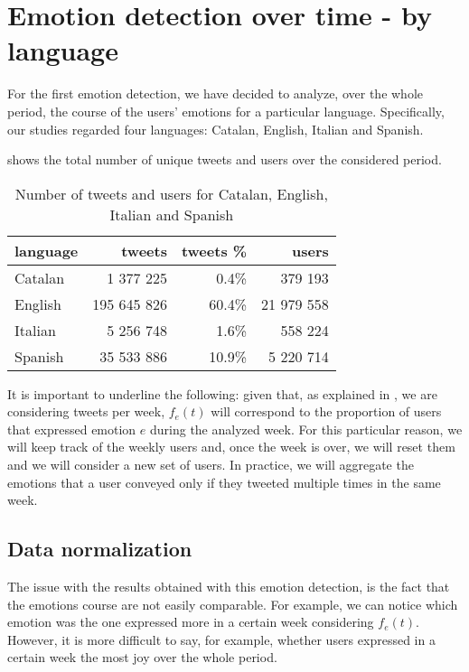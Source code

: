 \section{Emotion detection over time - by language}
\label{sec:emotion-by-language}

For the first emotion detection, we have decided to analyze, over the whole period, the course of the users' emotions for a particular language. Specifically, our studies regarded four languages: Catalan, English, Italian and Spanish.

 shows the total number of unique tweets and users over the considered period.

\begin{table}[h]
	\centering
	\begin{tabular}{lrrr}
		\toprule
		\textbf{language} & \textbf{tweets} & \textbf{tweets \%} & \textbf{users}
		\\
		\midrule
		Catalan & 1 377 225 & 0.4\% & 379 193
		\\
		English & 195 645 826 & 60.4\% & 21 979 558 
		\\
		Italian & 5 256 748 & 1.6\% & 558 224
		\\
		Spanish & 35 533 886 & 10.9\% & 5 220 714
		\\
		\bottomrule
	\end{tabular}
	\caption{Number of tweets and users for Catalan, English, Italian and Spanish}
	\label{tab:tweet-languages}
\end{table}

It is important to underline the following: given that, as explained in , we are considering tweets per week, \(f_e(t)\) will correspond to the proportion of users that expressed emotion \(e\) during the analyzed week. For this particular reason, we will keep track of the weekly users and, once the week is over, we will reset them and we will consider a new set of users. In practice, we will aggregate the emotions that a user conveyed only if they tweeted multiple times in the same week. 

\subsection{Data normalization}
\label{subsec:normalization}

The issue with the results obtained with this emotion detection, is the fact that the emotions course are not easily comparable. For example, we can notice which emotion was the one expressed more in a certain week considering \(f_e(t)\). However, it is more difficult to say, for example, whether users expressed in a certain week the most joy over the whole period.


